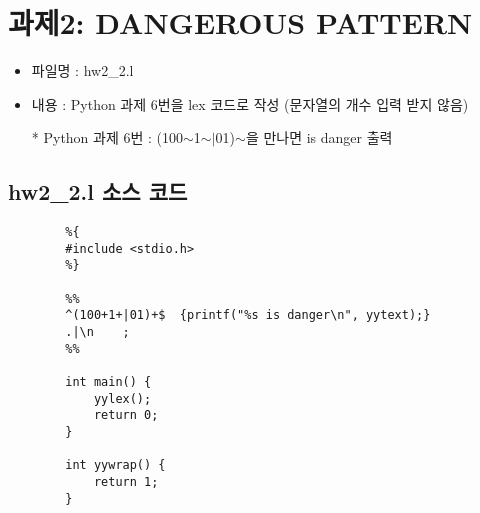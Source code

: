 \documentclass{article}
\begin{document}
\section{과제2: DANGEROUS PATTERN}

\begin{itemize}
	\item 파일명 : hw2\_2.l
	\item 내용 : Python 과제 6번을 lex 코드로 작성 (문자열의 개수 입력 받지 않음)
	
	* Python 과제 6번 : (100$\sim$1$\sim$$|$01)$\sim$을 만나면 is danger 출력
\end{itemize}

\subsection{hw2\_2.l 소스 코드}
\begin{lstlisting}
		%{
		#include <stdio.h>
		%}
		
		%%
		^(100+1+|01)+$	{printf("%s is danger\n", yytext);}
		.|\n	;
		%%
		
		int main() {
			yylex();
			return 0;
		}
		
		int yywrap() {
			return 1;
		}
\end{lstlisting}
\end{document}
